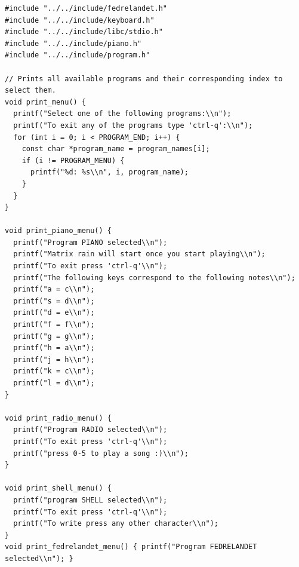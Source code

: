 \documentclass[../main.tex]{subfiles}
\begin{document}
\label{lst:menu_c}
\begin{verbatim}
#include "../../include/fedrelandet.h"
#include "../../include/keyboard.h"
#include "../../include/libc/stdio.h"
#include "../../include/piano.h"
#include "../../include/program.h"

// Prints all available programs and their corresponding index to select them.
void print_menu() {
  printf("Select one of the following programs:\\n");
  printf("To exit any of the programs type 'ctrl-q':\\n");
  for (int i = 0; i < PROGRAM_END; i++) {
    const char *program_name = program_names[i];
    if (i != PROGRAM_MENU) {
      printf("%d: %s\\n", i, program_name);
    }
  }
}

void print_piano_menu() {
  printf("Program PIANO selected\\n");
  printf("Matrix rain will start once you start playing\\n");
  printf("To exit press 'ctrl-q'\\n");
  printf("The following keys correspond to the following notes\\n");
  printf("a = c\\n");
  printf("s = d\\n");
  printf("d = e\\n");
  printf("f = f\\n");
  printf("g = g\\n");
  printf("h = a\\n");
  printf("j = h\\n");
  printf("k = c\\n");
  printf("l = d\\n");
}

void print_radio_menu() {
  printf("Program RADIO selected\\n");
  printf("To exit press 'ctrl-q'\\n");
  printf("press 0-5 to play a song :)\\n");
}

void print_shell_menu() {
  printf("program SHELL selected\\n");
  printf("To exit press 'ctrl-q'\\n");
  printf("To write press any other character\\n");
}
void print_fedrelandet_menu() { printf("Program FEDRELANDET selected\\n"); }


\end{verbatim}
\end{document}
